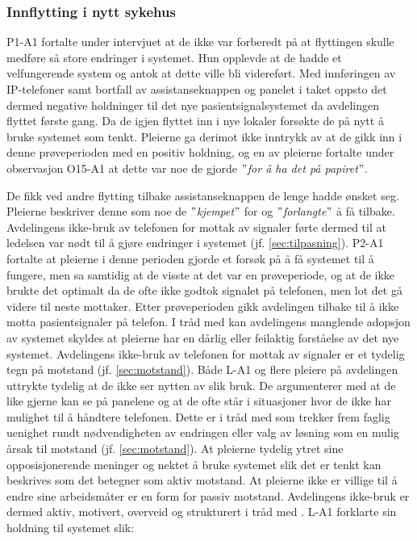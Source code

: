 \subsubsection{Innflytting i nytt sykehus}
P1-A1 fortalte under intervjuet at de ikke var forberedt på at flyttingen skulle medføre så store endringer i systemet. Hun opplevde at de hadde et velfungerende system og antok at dette ville bli videreført. Med innføringen av IP-telefoner samt bortfall av assistanseknappen og panelet i taket oppsto det dermed negative holdninger til det nye pasientsignalsystemet da avdelingen flyttet første gang. Da de igjen flyttet inn i nye lokaler forsøkte de på nytt å bruke systemet som tenkt. Pleierne ga derimot ikke inntrykk av at de gikk inn i denne prøveperioden med en positiv holdning, og en av pleierne fortalte under observasjon O15-A1 at dette var noe de gjorde \textit{$"$for å ha det på papiret$"$}. 

\noindent
De fikk ved andre flytting tilbake assistanseknappen de lenge hadde ønsket seg. Pleierne beskriver denne som noe de \textit{$"$kjempet$"$} for og \textit{$"$forlangte$"$} å få tilbake. Avdelingens ikke-bruk av telefonen for mottak av signaler førte dermed til at ledelsen var nødt til å gjøre endringer i systemet (jf. \ref{sec:tilpasning}). P2-A1 fortalte at pleierne i denne perioden gjorde et forsøk på å få systemet til å fungere, men sa samtidig at de visste at det var en prøveperiode, og at de ikke brukte det optimalt da de ofte ikke godtok signalet på telefonen, men lot det gå videre til neste mottaker. Etter prøveperioden gikk avdelingen tilbake til å ikke motta pasientsignaler på telefon. I tråd med \citet{Orlikowski92} kan avdelingens manglende adopsjon av systemet skyldes at pleierne har en dårlig eller feilaktig forståelse av det nye systemet. Avdelingens ikke-bruk av telefonen for mottak av signaler er et tydelig tegn på motstand (jf. \ref{sec:motstand}). Både L-A1 og flere pleiere på avdelingen uttrykte tydelig at de ikke ser nytten av slik bruk. De argumenterer med at de like gjerne kan se på panelene og at de ofte står i situasjoner hvor de ikke har mulighet til å håndtere telefonen. Dette er i tråd med \citet{Jacobsen12} som trekker frem faglig uenighet rundt nødvendigheten av endringen eller valg av løsning som en mulig årsak til motstand (jf. \ref{sec:motstand}). At pleierne tydelig ytret sine opposisjonerende meninger og nektet å bruke systemet slik det er tenkt kan beskrives som det \citet{Lapointe05} betegner som aktiv motstand. At pleierne ikke er villige til å endre sine arbeidsmåter er en form for passiv motstand. Avdelingens ikke-bruk er dermed aktiv, motivert, overveid og strukturert i tråd med \citet{Satchell09}. L-A1 forklarte sin holdning til systemet slik: 

